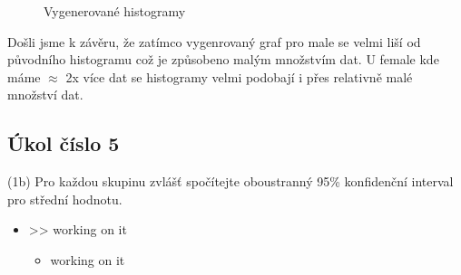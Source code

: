 \documentclass[paper=a4, fontsize=12pt]{scrartcl}
\numberwithin{equation}{section}		%
\numberwithin{figure}{section}			%
\numberwithin{table}{section}				%
\begin{document}
\begin{figure}[H]
  \centering
  \qquad
  \caption{Vygenerované histogramy}
\end{figure}
Došli jsme k závěru, že zatímco vygenrovaný graf pro male se velmi liší od původního
histogramu což je způsobeno malým množstvím dat. U female kde máme $\approx$ 2x více dat se histogramy
velmi podobají i přes relativně malé množství dat.

\subsection{Úkol číslo 5}
(1b) Pro každou skupinu zvlášť spočítejte oboustranný 95\% konfidenční interval pro střední hodnotu.

\begin{itemize}
	\item >> 
	working on it
	\begin{itemize}
		\item working on it
	\end{itemize}
\end{itemize}

\end{document}
